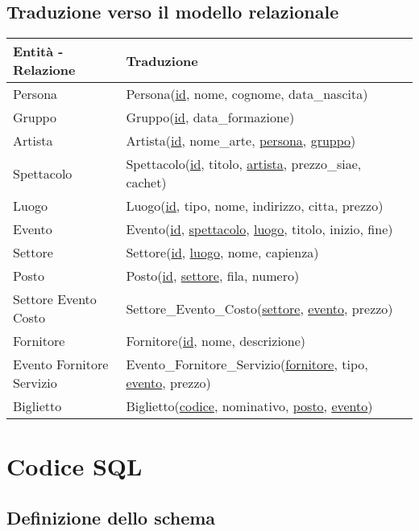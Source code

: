 \documentclass[a4paper,11pt]{article}
\begin{document}
\subsection{Traduzione verso il modello relazionale}

\begin{tabularx}{\textwidth}{|X|>{\raggedright\arraybackslash}X|>{\raggedright\arraybackslash}X|}
\hline
  \textbf{Entità - Relazione} & \textbf{Traduzione}\\
\hline
  Persona & Persona(\underline{id}, nome, cognome, data\_nascita) \\
\hline
  Gruppo & Gruppo(\underline{id}, data\_formazione) \\
\hline
  Artista & Artista(\underline{id}, nome\_arte, \underline{persona}, \underline{gruppo}) \\
\hline
  Spettacolo & Spettacolo(\underline{id}, titolo, \underline{artista}, prezzo\_siae, cachet) \\
\hline
  Luogo & Luogo(\underline{id}, tipo, nome, indirizzo, citta, prezzo) \\
\hline
  Evento & Evento(\underline{id}, \underline{spettacolo}, \underline{luogo}, titolo, inizio, fine) \\
\hline
  Settore & Settore(\underline{id}, \underline{luogo}, nome, capienza) \\
\hline
  Posto & Posto(\underline{id}, \underline{settore}, fila, numero) \\
\hline
  Settore Evento Costo & Settore\_Evento\_Costo(\underline{settore}, \underline{evento}, prezzo) \\
\hline
  Fornitore & Fornitore(\underline{id}, nome, descrizione) \\
\hline
  Evento Fornitore Servizio & Evento\_Fornitore\_Servizio(\underline{fornitore}, tipo, \underline{evento}, prezzo) \\
\hline
  Biglietto & Biglietto(\underline{codice}, nominativo, \underline{posto}, \underline{evento}) \\
\hline
\end{tabularx}

\section{Codice SQL}

\subsection{Definizione dello schema}

\end{document}
